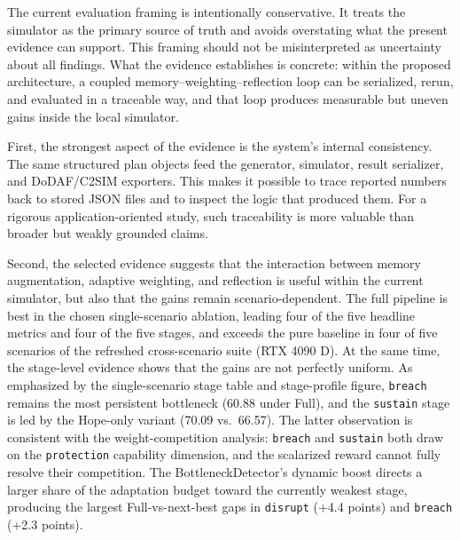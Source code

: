 The current evaluation framing is intentionally conservative. It treats the simulator as the primary source of truth and avoids overstating what the present evidence can support. This framing should not be misinterpreted as uncertainty about all findings. What the evidence establishes is concrete: within the proposed architecture, a coupled memory--weighting--reflection loop can be serialized, rerun, and evaluated in a traceable way, and that loop produces measurable but uneven gains inside the local simulator.

First, the strongest aspect of the evidence is the system's internal consistency. The same structured plan objects feed the generator, simulator, result serializer, and DoDAF/C2SIM exporters. This makes it possible to trace reported numbers back to stored JSON files and to inspect the logic that produced them. For a rigorous application-oriented study, such traceability is more valuable than broader but weakly grounded claims.

Second, the selected evidence suggests that the interaction between memory augmentation, adaptive weighting, and reflection is useful within the current simulator, but also that the gains remain scenario-dependent. The full pipeline is best in the chosen single-scenario ablation, leading four of the five headline metrics and four of the five stages, and exceeds the pure baseline in four of five scenarios of the refreshed cross-scenario suite (RTX 4090 D). At the same time, the stage-level evidence shows that the gains are not perfectly uniform. As emphasized by the single-scenario stage table and stage-profile figure, \texttt{breach} remains the most persistent bottleneck (60.88 under Full), and the \texttt{sustain} stage is led by the Hope-only variant (70.09 vs.\ 66.57). The latter observation is consistent with the weight-competition analysis: \texttt{breach} and \texttt{sustain} both draw on the \texttt{protection} capability dimension, and the scalarized reward cannot fully resolve their competition. The BottleneckDetector's dynamic boost directs a larger share of the adaptation budget toward the currently weakest stage, producing the largest Full-vs-next-best gaps in \texttt{disrupt} (+4.4 points) and \texttt{breach} (+2.3 points).

